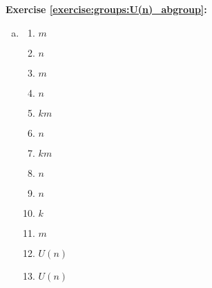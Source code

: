 \noindent\textbf{Exercise \ref{exercise:groups:U(n)_abgroup}:}
\begin{enumerate}[(a)]
\item
%
	\begin{multicols}{4}
	\begin{enumerate}[1.]
	\item
	$m$
	
	\item
	$n$
	
	\item
	$m$
	
	\item
	$n$
	
	\item
	$km$
	
	\item
	$n$
	
	\item
	$km$
	
	\item
	$n$
	
	\item
	$n$
	
	\item
	$k$
	
	\item
	$m$
	
	\item
	$U(n)$
	
	\item
	$U(n)$
	\end{enumerate}
	\end{multicols}
	

\end{enumerate}
